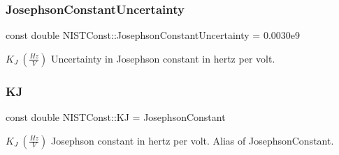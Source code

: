 \subsubsection{\texorpdfstring{Josephson\+Constant\+Uncertainty}{JosephsonConstantUncertainty}}
{\footnotesize\ttfamily const double N\+I\+S\+T\+Const\+::\+Josephson\+Constant\+Uncertainty = 0.\+0030e9}

$K_J \ (\frac{Hz}{V})$ Uncertainty in Josephson constant in hertz per volt. \mbox{\label{group___josephson_constant_ga75e8a1fd7b1434083e96c2f0291eb756}} 
\subsubsection{\texorpdfstring{KJ}{KJ}}
{\footnotesize\ttfamily const double N\+I\+S\+T\+Const\+::\+KJ = Josephson\+Constant}

$K_J \ (\frac{Hz}{V})$ Josephson constant in hertz per volt. Alias of Josephson\+Constant. 